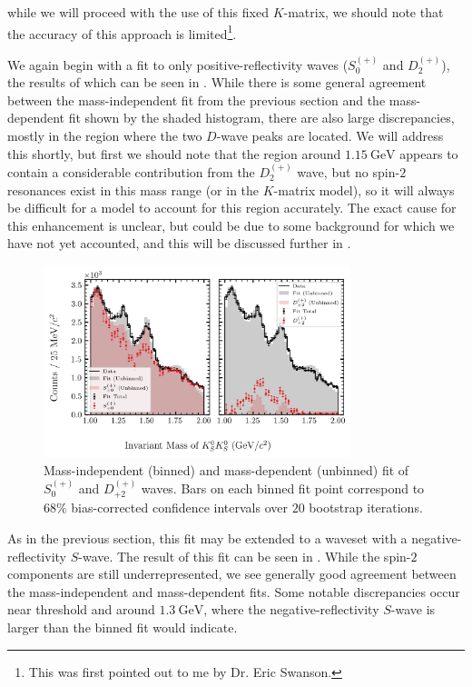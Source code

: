 while we will proceed with the use of this fixed $K$-matrix, we should note that the accuracy of this approach is limited\footnote{This was first pointed out to me by Dr. Eric Swanson.}.

We again begin with a fit to only positive-reflectivity waves ($S_0^{(+)}$ and $D_2^{(+)}$), the results of which can be seen in . While there is some general agreement between the mass-independent fit from the previous section and the mass-dependent fit shown by the shaded histogram, there are also large discrepancies, mostly in the region where the two $D$-wave peaks are located. We will address this shortly, but first we should note that the region around $\SI{1.15}{\giga\electronvolt}$ appears to contain a considerable contribution from the $D_2^{(+)}$ wave, but no spin-$2$ resonances exist in this mass range (or in the $K$-matrix model), so it will always be difficult for a model to account for this region accurately. The exact cause for this enhancement is unclear, but could be due to some background for which we have not yet accounted, and this will be discussed further in .

\begin{figure}
  \begin{center}
    \includegraphics[width=0.8\textwidth]{figures/binned_and_unbinned_fit_chisqdof_3.4_splot_D_1s_2b_phase_factor_waves491_uncertainty_bootstrap-SE.png}
  \end{center}
  \caption{Mass-independent (binned) and mass-dependent (unbinned) fit of $S_{0}^{(+)}$ and $D_{+2}^{(+)}$ waves. Bars on each binned fit point correspond to $68\%$ bias-corrected confidence intervals over $20$ bootstrap iterations.}\label{fig:unbinned-fit-chisqdof-3.4-Sp-D2p}
\end{figure}

As in the previous section, this fit may be extended to a waveset with a negative-reflectivity $S$-wave. The result of this fit can be seen in . While the spin-$2$ components are still underrepresented, we see generally good agreement between the mass-independent and mass-dependent fits. Some notable discrepancies occur near threshold and around $\SI{1.3}{\giga\electronvolt}$, where the negative-reflectivity $S$-wave is larger than the binned fit would indicate.

